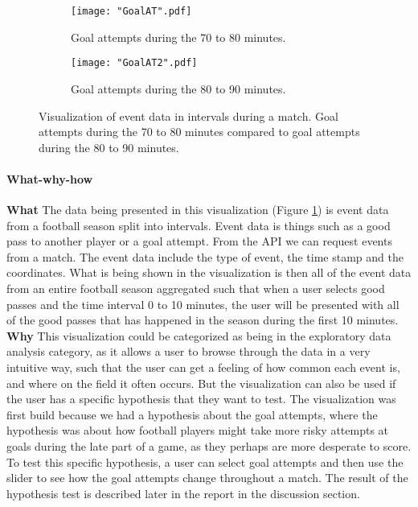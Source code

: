 \documentclass[Report.tex]{subfiles}
\begin{document}
\begin{figure}
\center
\begin{subfigure}[b]{0.7\linewidth}
\texttt{[image: "GoalAT".pdf]}
\caption{Goal attempts during the 70 to 80 minutes.}
\end{subfigure}
\begin{subfigure}[b]{0.7\textwidth}
\texttt{[image: "GoalAT2".pdf]}
\caption{Goal attempts during the 80 to 90 minutes.}
\end{subfigure}
\caption{Visualization of event data in intervals during a match. Goal attempts during the 70 to 80 minutes compared to goal attempts during the 80 to 90 minutes.}

\label{Fig:Events}
\end{figure}

\paragraph{What-why-how\\}
\textbf{What} The data being presented in this visualization (Figure \ref{Fig:Events}) is event data from a football season split into intervals. Event data is things such as a good pass to another player or a goal attempt. From the API we can request events from a match. The event data include the type of event, the time stamp and the coordinates. What is being shown in the visualization is then all of the event data from an entire football season aggregated such that when a user selects good passes and the time interval 0 to 10 minutes, the user will be presented with all of the good passes that has happened in the season during the first 10 minutes.\\

\noindent \textbf{Why} This visualization could be categorized as being in the exploratory data analysis category, as it allows a user to browse through the data in a very intuitive way, such that the user can get a feeling of how common each event is, and where on the field it often occurs. But the visualization can also be used if the user has a specific hypothesis that they want to test. The visualization was first build because we had a hypothesis about the goal attempts, where the hypothesis was about how football players might take more risky attempts at goals during the late part of a game, as they perhaps are more desperate to score. To test this specific hypothesis, a user can select goal attempts and then use the slider to see how the goal attempts change throughout a match. The result of the hypothesis test is described later in the report in the discussion section.\\
\end{document}
